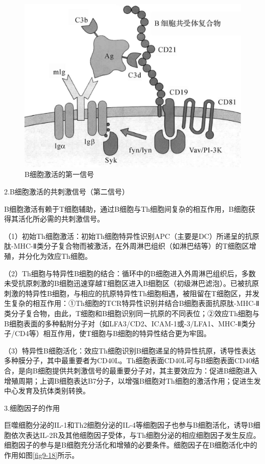 \begin{figure}[!htbp]
 \centering
 \includegraphics{./images/Image00143.jpg}
 \captionsetup{justification=centering}
 \caption{B细胞激活的第一信号}
 \label{fig9-17}
  \end{figure} 

2.B细胞激活的共刺激信号（第二信号）

B细胞激活有赖于T细胞辅助，通过B细胞与Th细胞间复杂的相互作用，B细胞获得其活化所必需的共刺激信号。

（1）初始Th细胞激活：初始Th细胞特异性识别APC（主要是DC）所递呈的抗原肽-MHC-Ⅱ类分子复合物而被激活，在外周淋巴组织（如淋巴结等）的T细胞区增殖，并分化为效应Th细胞。

（2）Th细胞与特异性B细胞的结合：循环中的B细胞进入外周淋巴组织后，多数未受抗原刺激的B细胞迅速穿越T细胞区进入B细胞区（初级淋巴滤泡）。已被抗原刺激的特异性B细胞，与相应的抗原特异性Th细胞相遇，被阻留在T细胞区，并发生复杂的相互作用：①Th细胞的TCR特异性识别并结合B细胞表面抗原肽-MHC-Ⅱ类分子复合物，由此，T细胞和B细胞识别同一抗原的不同表位；②效应Th细胞与B细胞表面的多种黏附分子对（如LFA3/CD2、ICAM-1或-3/LFA1、MHC-Ⅱ类分子/CD4等）相互作用，使T细胞与B细胞的特异性结合更为牢固。

（3）特异性B细胞活化：效应Th细胞识别B细胞递呈的特异性抗原，诱导性表达多种膜分子，其中最重要者为CD40L。Th细胞表面CD40L可与B细胞表面CD40结合，是向B细胞提供共刺激信号的最重要分子对，其主要效应为：促进B细胞进入增殖周期；上调B细胞表达B7分子，以增强B细胞对Th细胞的激活作用；促进生发中心发育及抗体类别转换。

3.细胞因子的作用

巨噬细胞分泌的IL-1和Th2细胞分泌的IL-4等细胞因子也参与B细胞活化，诱导B细胞依次表达IL-2R及其他细胞因子受体，与Th细胞分泌的相应细胞因子发生反应。细胞因子的参与是B细胞充分活化和增殖的必要条件。细胞因子在B细胞活化中的作用如图\ref{fig9-18}所示。

